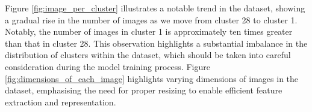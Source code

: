\documentclass[letterpaper,9pt,twocolumn,twoside,]{pinp}
\begin{document}
\begin{Shaded}
\begin{Highlighting}[]
\OtherTok{\textless{}{-}} \NormalTok{(} \NormalTok{(),}
       \NormalTok{())}

 \SpecialCharTok{:}\NormalTok{) \{}
\OtherTok{\textless{}{-}} \NormalTok{(}\NormalTok{,}
   
         \SpecialCharTok{\textbackslash{}\textbackslash{}}\SpecialCharTok{\textbackslash{}\textbackslash{}}\NormalTok{,}
         \NormalTok{)) \{}
\OtherTok{\textless{}{-}} 
\OtherTok{\textless{}{-}} \NormalTok{(img)[}\NormalTok{]}
\OtherTok{\textless{}{-}} \NormalTok{(img)[}\NormalTok{]}
\OtherTok{\textless{}{-}} 
        \NormalTok{(}
\NormalTok{  \}}
\NormalTok{\}}

\NormalTok{(}\SpecialCharTok{+}
  \NormalTok{(} \NormalTok{) }\SpecialCharTok{+}
  \NormalTok{(}\NormalTok{) }\SpecialCharTok{+}
  \NormalTok{(}\NormalTok{) }\SpecialCharTok{+}
  \NormalTok{(}\NormalTok{)}
\end{Highlighting}
\end{Shaded}

Figure \ref{fig:image_per_cluster} illustrates a notable trend in the
dataset, showing a gradual rise in the number of images as we move from
cluster 28 to cluster 1. Notably, the number of images in cluster 1 is
approximately ten times greater than that in cluster 28. This
observation highlights a substantial imbalance in the distribution of
clusters within the dataset, which should be taken into careful
consideration during the model training process. Figure
\ref{fig:dimensions_of_each_image} highlights varying dimensions of
images in the dataset, emphasising the need for proper resizing to
enable efficient feature extraction and representation.
\end{document}

